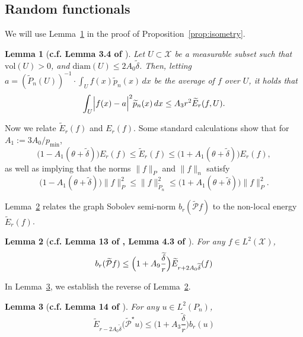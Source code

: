\documentclass[twoside]{article}
\newcommand{\diam}{\mathrm{diam}}
\newcommand{\1}{\mathbf{1}}
\newcommand{\Xset}{\mathcal{X}}
\newcommand{\Leb}{L}
\newcommand{\mc}[1]{\mathcal{#1}}
\newcommand{\wt}[1]{\widetilde{#1}}
\newtheorem{lemma}{Lemma}
\theoremstyle{definition}
\theoremstyle{remark}
\begin{document}
\subsection{Random functionals}
\label{subsec:random_functionals}
We will use Lemma~\ref{lem:poincare} in the proof of Proposition~\ref{prop:isometry}. 
\begin{lemma}[\textbf{c.f. Lemma 3.4 of \citet{burago2014}}]
	\label{lem:poincare}
	Let $U \subset \Xset$ be a measurable subset such that $\mathrm{vol}(U) > 0$, and $\diam(U) \leq 2A_0\wt{\delta}$. Then, letting $a = (\wt{P}_n(U))^{-1} \cdot \int_{U} f(x) \wt{p}_n(x) \,dx$ be the average of $f$ over $U$, it holds that
	\begin{equation*}
	\int_{U} \Bigl|f(x)-a\Bigr|^2 \wt{p}_n(x)\,dx \leq A_3 r^2 \wt{E}_r(f,U).
	\end{equation*}
\end{lemma}

Now we relate $\wt{E}_r(f)$ and $E_r(f)$. Some standard calculations show that for $A_1 := 3A_0/p_{\min}$,
\begin{equation}
\label{eqn:calder19_1}
\bigl(1 - A_1(\theta + \wt{\delta})\bigr) E_r(f) \leq \wt{E}_r(f) \leq \bigl(1 + A_1(\theta + \wt{\delta})\bigr) E_r(f),
\end{equation}
as well as implying that the norms $\|f\|_{P}$ and $\|f\|_{n}$ satisfy
\begin{equation}
\label{eqn:calder19_2}
\bigl(1 - A_1(\theta + \wt{\delta})\bigr) \|f\|_{P}^2 \leq \|f\|_{\wt{P}_n}^2 \leq \bigl(1 + A_1(\theta + \wt{\delta})\bigr) \|f\|_{P}^2.
\end{equation}

Lemma~\ref{lem:first_order_graph_sobolev_seminorm_discretized} relates the graph Sobolev semi-norm $b_r(\wt{\mc{P}}f)$ to the non-local energy $\wt{E}_r(f)$. 
\begin{lemma}[\textbf{c.f. Lemma 13 of \citet{trillos2019}, Lemma 4.3 of \citet{burago2014}}]
	\label{lem:first_order_graph_sobolev_seminorm_discretized}
	For any $f \in \Leb^2(\Xset)$,
	\begin{equation*}
	b_r(\wt{\mc{P}}f) \leq \Bigl(1 + A_9\frac{\wt{\delta}}{r}\Bigr) \wt{E}_{r + 2A_0\wt{\delta}}(f)
	\end{equation*}
\end{lemma}

In Lemma~\ref{lem:first_order_graph_sobolev_seminorm_discretized_lb}, we establish the reverse of Lemma~\ref{lem:first_order_graph_sobolev_seminorm_discretized}. 
\begin{lemma}[\textbf{c.f. Lemma 14 of \citet{trillos2019}}]
	\label{lem:first_order_graph_sobolev_seminorm_discretized_lb}
	For any $u \in \Leb^2(P_n)$, 
	\begin{equation*}
	\wt{E}_{r - 2A_0\wt{\delta}}\bigl(\wt{\mc{P}}^{\star}u\bigr) \leq \biggl(1 + A_3\frac{\wt{\delta}}{r}\biggr) b_{r}(u)
	\end{equation*}
\end{lemma}
\end{document}
